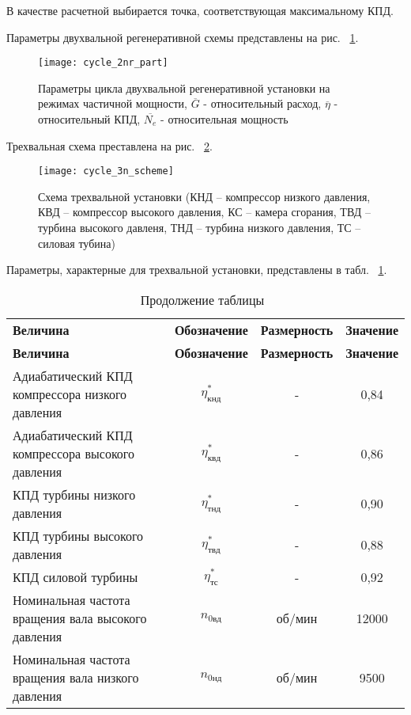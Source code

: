 В качестве расчетной выбирается точка, соответствующая максимальному КПД.

Параметры двухвальной регенеративной схемы представлены на рис. ~\ref{img:cycle_2nr_part}.

\begin{figure}[H]
    \centering
    \texttt{[image: cycle\_2nr\_part]}
    \caption{Параметры цикла двухвальной регенеративной установки на режимах частичной мощности,
	$\overline{G}$ - относительный расход, $\overline{\eta}$ - относительный КПД, $\overline{N_e}$ - относительная мощность}
    \label{img:cycle_2nr_part}
\end{figure}

Трехвальная схема преставлена на рис. ~\ref{img:cycle_3n_scheme}.

\begin{figure}[H]
    \centering
    \texttt{[image: cycle\_3n\_scheme]}
    \caption{Схема трехвальной установки (КНД – компрессор низкого давления, КВД – компрессор высокого давления, КС – камера сгорания, ТВД – турбина высокого давленя, ТНД – турбина низкого давления, ТС – силовая тубина)}
    \label{img:cycle_3n_scheme}
\end{figure}

Параметры, характерные для трехвальной установки, представлены в табл. ~\ref{tab:cycle-3n-parameters}.

\begin{longtable}{|p{7cm}|c|c|c|}
	\caption{Параметры трехвальной схемы} 
	\label{tab:cycle-3n-parameters}
	\endfirsthead
	\caption*{\tabcapalign Продолжение таблицы~\thetable}\\[-0.45\onelineskip]
	\hline
	\textbf{Величина} & \textbf{Обозначение} & \textbf{Размерность} & \textbf{Значение} \\ \hline
	\endhead
	\hline
	\textbf{Величина} & \textbf{Обозначение} & \textbf{Размерность} & \textbf{Значение} \\ \hline
	Адиабатический КПД компрессора низкого давления & $\eta_{кнд}^*$ & - & 0,84 \\ \hline
	Адиабатический КПД компрессора высокого давления & $\eta_{квд}^*$ & - & 0,86 \\ \hline
	КПД турбины низкого давления & $\eta_{тнд}^*$ & - & 0,90 \\ \hline
	КПД турбины высокого давления & $\eta_{твд}^*$ & - & 0,88 \\ \hline
	КПД силовой турбины & $\eta_{тс}^*$ & - & 0,92 \\ \hline
	Номинальная частота вращения вала высокого давления & $n_{0вд}$ & об/мин & 12000 \\ \hline
	Номинальная частота вращения вала низкого давления & $n_{0нд}$ & об/мин & 9500 \\ \hline
\end{longtable}

